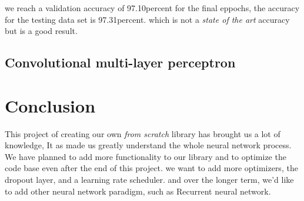 \documentclass[a4paper, twocolumn, twoside]{article}
\begin{document}
	we reach a validation accuracy of 97.10percent for the final eppochs, the accuracy for the testing data set is 97.31percent.
	which is not a \textit{state of the art} accuracy but is a good result.

	\subsection{Convolutional multi-layer perceptron}

	\section{Conclusion}
	This project of creating our own \textit{from scratch} library has brought us a lot of knowledge,
	It as made us greatly understand the whole neural network process.
	We have planned to add more functionality to our library and to optimize the code base even after the end of this project.
	we want to add more optimizers, the dropout layer, and a learning rate scheduler.
	and over the longer term, we'd like to add other neural network paradigm, such as Recurrent neural network.

	\nocite{*}
	\printbibliography
\end{document}
